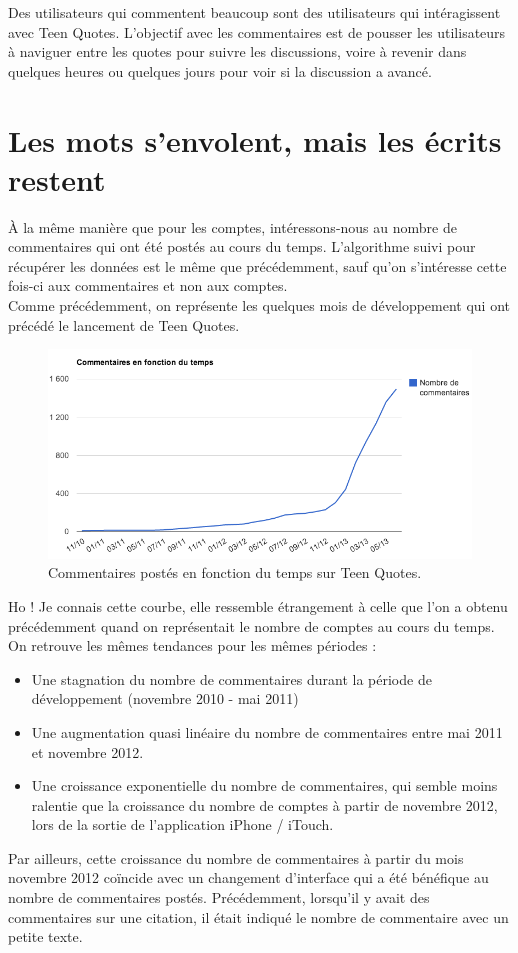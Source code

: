 \documentclass{report}
\begin{document}
	Des utilisateurs qui commentent beaucoup sont des utilisateurs qui intéragissent avec Teen Quotes. L'objectif avec les commentaires est de pousser les utilisateurs à naviguer entre les quotes pour suivre les discussions, voire à revenir dans quelques heures ou quelques jours pour voir si la discussion a avancé.

	\section{Les mots s'envolent, mais les écrits restent}
	À la même manière que pour les comptes, intéressons-nous au nombre de commentaires qui ont été postés au cours du temps. L'algorithme suivi pour récupérer les données est le même que précédemment, sauf qu'on s'intéresse cette fois-ci aux commentaires et non aux comptes.\\

	Comme précédemment, on représente les quelques mois de développement qui ont précédé le lancement de Teen Quotes.
	\begin{figure}[H]
		\center
		\includegraphics[width=450px]{images/commentairesTemps.png}
		\caption{Commentaires postés en fonction du temps sur Teen Quotes.}
	\end{figure}
	Ho ! Je connais cette courbe, elle ressemble étrangement à celle que l'on a obtenu précédemment quand on représentait le nombre de comptes au cours du temps. On retrouve les mêmes tendances pour les mêmes périodes :
	\vspace{10px}
	\begin{itemize}
		\item Une stagnation du nombre de commentaires durant la période de développement (novembre 2010 - mai 2011)
		\item Une augmentation quasi linéaire du nombre de commentaires entre mai 2011 et novembre 2012.
		\item Une croissance exponentielle du nombre de commentaires, qui semble moins ralentie que la croissance du nombre de comptes à partir de novembre 2012, lors de la sortie de l'application iPhone / iTouch.
	\end{itemize}
	\vspace{10px}
	Par ailleurs, cette croissance du nombre de commentaires à partir du mois novembre 2012 coïncide avec un changement d'interface qui a été bénéfique au nombre de commentaires postés. Précédemment, lorsqu'il y avait des commentaires sur une citation, il était indiqué le nombre de commentaire avec un petite texte.\\
\end{document}

